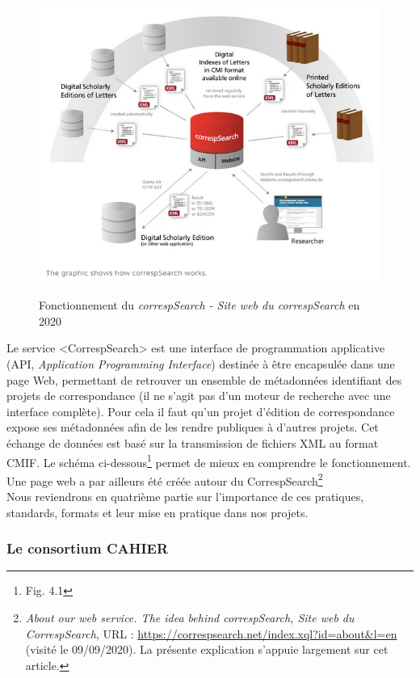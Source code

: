 \begin{figure}[ht]
    \centering
    \caption{Fonctionnement du \emph{correspSearch - Site web du correspSearch} en 2020}
    \includegraphics[width=16cm]{images/correspSearch.png}
    \label{correspSearch}
\end{figure}

Le service <CorrespSearch> est une interface de programmation applicative (API, \emph{Application Programming Interface}) destinée à être encapsulée dans une page Web, permettant de retrouver un ensemble de métadonnées identifiant des projets de correspondance (il ne s’agit pas d’un moteur de recherche avec une interface complète). Pour cela il faut qu’un projet d’édition de correspondance expose ses métadonnées afin de les rendre publiques à d’autres projets. Cet échange de données est basé sur la transmission de fichiers XML au format CMIF. Le schéma ci-dessous\footnote{Fig. 4.1} permet de mieux en comprendre le fonctionnement.
Une page web a par ailleurs été créée autour du CorrespSearch\footnote{\emph{About our web service. The idea behind correspSearch, Site web du CorrespSearch}, URL : \url{https://correspsearch.net/index.xql?id=about&l=en} (visité le 09/09/2020). La présente explication s'appuie largement sur cet article.}\\

Nous reviendrons en quatrième partie sur l'importance de ces pratiques, standards, formats et leur mise en pratique dans nos projets.



\subsubsection{Le consortium CAHIER}

